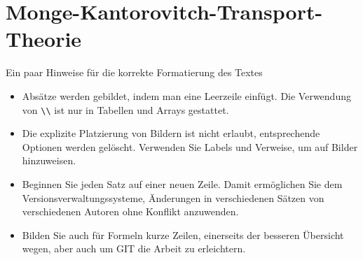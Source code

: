 %
%
%
%
\chapter{Monge-Kantorovitch-Transport-Theorie\label{chapter:mongekant}}
\begin{refsection}

Ein paar Hinweise für die korrekte Formatierung des Textes
\begin{itemize}
\item
Absätze werden gebildet, indem man eine Leerzeile einfügt.
Die Verwendung von \verb+\\+ ist nur in Tabellen und Arrays gestattet.
\item
Die explizite Platzierung von Bildern ist nicht erlaubt, entsprechende
Optionen werden gelöscht.
Verwenden Sie Labels und Verweise, um auf Bilder hinzuweisen.
\item
Beginnen Sie jeden Satz auf einer neuen Zeile.
Damit ermöglichen Sie dem Versionsverwaltungssysteme, Änderungen
in verschiedenen Sätzen von verschiedenen Autoren ohne Konflikt
anzuwenden.
\item
Bilden Sie auch für Formeln kurze Zeilen, einerseits der besseren
Übersicht wegen, aber auch um GIT die Arbeit zu erleichtern.
\end{itemize}






\printbibliography[heading=subbibliography]
\end{refsection}
